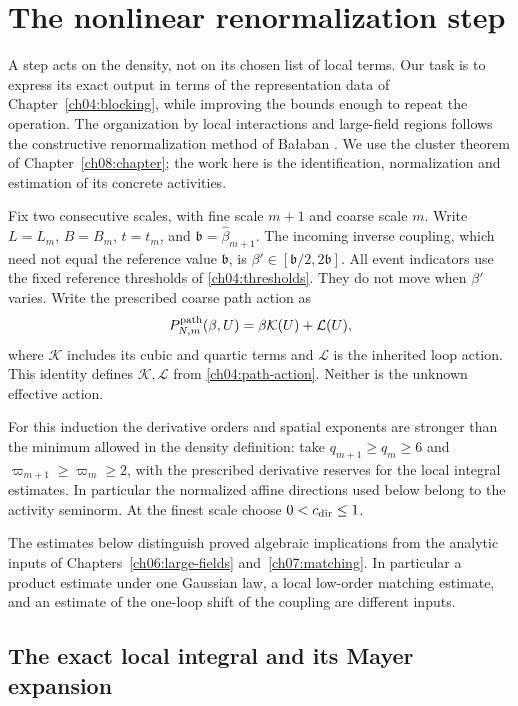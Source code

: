 \chapter{The nonlinear renormalization step}
\label{ch09:renormalization}

A step acts on the density, not on its chosen list
of local terms. Our task is to express its exact output in terms of the
representation data of Chapter~\ref{ch04:blocking}, while improving the
bounds enough to repeat the operation. The organization by local
interactions and large-field regions follows the constructive
renormalization method of Ba{\l}aban
\cite{Balaban1988Expansions}. We use the cluster theorem of
Chapter~\ref{ch08:chapter}; the work here is the identification,
normalization and estimation of its concrete activities.

Fix two consecutive scales, with fine scale $m+1$ and coarse
scale $m$. Write $L=L_m$, $B=B_m$, $t=t_m$, and
$\mathfrak b=\widehat\beta_{m+1}$. The incoming inverse coupling, which need not equal the reference value $\mathfrak b$, is
$\beta'\in[\mathfrak b/2,2\mathfrak b]$.
All event indicators use the fixed reference thresholds of
\eqref{ch04:thresholds}. They do not move when $\beta'$ varies.
Write the prescribed coarse path action as
\[
 P^{\rm path}_{N,m}(\beta,U)=\beta\mathcal K(U)+\mathcal L(U),
\]
where $\mathcal K$ includes its cubic and quartic terms and
$\mathcal L$ is the inherited loop action.
This identity defines $\mathcal K,\mathcal L$ from
\eqref{ch04:path-action}. Neither is the unknown effective action.

For this induction the derivative orders and spatial exponents
are stronger than the minimum allowed in the density definition:
take $q_{m+1}\ge q_m\ge6$ and
$\varpi_{m+1}\ge\varpi_m\ge2$, with the prescribed derivative
reserves for the local integral estimates. In particular the
normalized affine directions used below belong to the activity
seminorm. At the finest scale choose $0<c_{\rm dir}\le1$.

The estimates below distinguish proved algebraic implications
from the analytic inputs of Chapters~\ref{ch06:large-fields}
and~\ref{ch07:matching}. In particular a product estimate under
one Gaussian law, a local low-order matching estimate, and an
estimate of the one-loop shift of the coupling are different inputs.

\section{The exact local integral and its Mayer expansion}
\label{ch09:integral}

